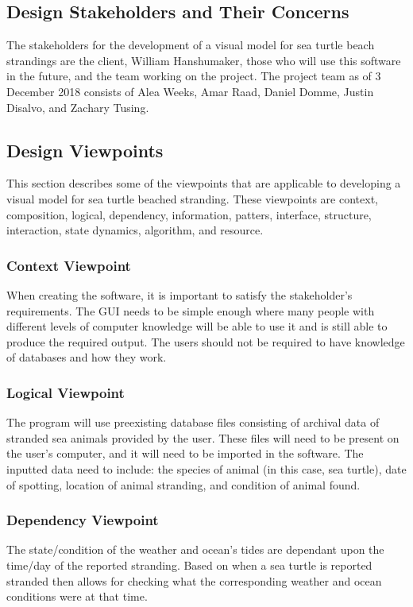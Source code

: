 \documentclass[onecolumn, draftclsnofoot,10pt, compsoc]{IEEEtran}
\begin{document}
\begin{singlespace}
\section{Design Stakeholders and Their Concerns}
    The stakeholders for the development of a visual model for sea turtle beach strandings are the client, William Hanshumaker, those who will use this software in the future, and the team working on the project.  The project team as of 3 December 2018 consists of Alea Weeks, Amar Raad, Daniel Domme, Justin Disalvo, and Zachary Tusing.
    
\subsection{Design Viewpoints}
    This section describes some of the viewpoints that are applicable to developing a visual model for sea turtle beached stranding. These viewpoints are context, composition, logical, dependency, information, patters, interface, structure, interaction, state dynamics, algorithm, and resource.
    
    \subsubsection{Context Viewpoint}
    When creating the software, it is important to satisfy the stakeholder's requirements. The GUI needs to be simple enough where many people with different levels of computer knowledge will be able to use it and is still able to produce the required output. The users should not be required to have knowledge of databases and how they work.
    
    \subsubsection{Logical Viewpoint}
    The program will use preexisting database files consisting of archival data of stranded sea animals provided by the user.  These files will need to be present on the user's computer, and it will need to be imported in the software.    The inputted data need to include: the species of animal (in this case, sea turtle), date of spotting, location of animal stranding, and condition of animal found.  
    
    \subsubsection{Dependency Viewpoint}
    The state/condition of the weather and ocean's tides are dependant upon the time/day of the reported stranding. Based on when a sea turtle is reported stranded then allows for checking what the corresponding weather and ocean conditions were at that time.
    

\end{singlespace}
\end{document}
